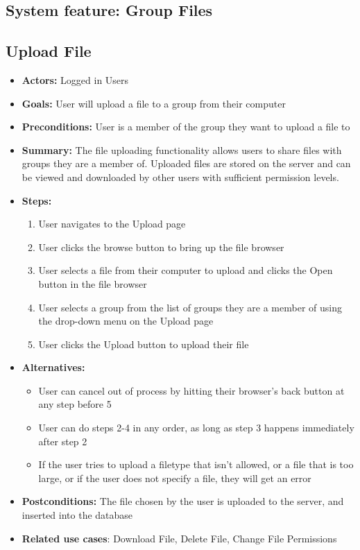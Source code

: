 \subsection{System feature: Group Files}
     \subsection{Upload File}
     \begin{itemize}
          \item{\textbf{Actors:} Logged in Users}
          \item{\textbf{Goals:} User will upload a file to a group 
                 from their computer}
          \item{\textbf{Preconditions:} User is a member of the 
                 group they want to upload a file to}
          \item{\textbf{Summary:} The file uploading functionality allows users 
		   to share files with groups they are a member of.  Uploaded files are stored 
		   on the server and can be viewed and downloaded by other users with sufficient
		   permission levels.}
	  \item{\textbf{Steps:}}
	  \begin{enumerate}
	       \item{User navigates to the Upload page}
	       \item{User clicks the browse button to bring up 
		     the file browser}
	       \item{User selects a file from their computer to upload 
		     and clicks the Open button in the file browser}
	       \item{User selects a group from the list of groups they 
		     are a member of using the drop-down menu on the 
		     Upload page}
	       \item{User clicks the Upload button to upload their file}
	  \end{enumerate}
	  \item{\textbf{Alternatives:}}
	  \begin{itemize}
	       \item{User can cancel out of process by hitting their 
		     browser's back button at any step before 5}
	       \item{User can do steps 2-4 in any order, as long as 
		     step 3 happens immediately after step 2}
	       \item{If the user tries to upload a filetype that isn't 
		     allowed, or a file that is too large, or if the 
		     user does not specify a file, they will get an error}
	  \end{itemize}
	  \item{\textbf{Postconditions:} The file chosen by the user 
	        is uploaded to the server, and inserted into the database}
	  \item{\textbf{Related use cases}: Download File, Delete File, 
		  Change File Permissions}
     \end{itemize}

